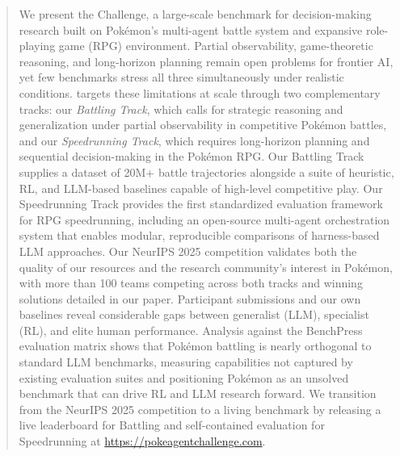 \begin{abstract}
    We present the \pokeagent Challenge, a large-scale benchmark for decision-making research built on Pokémon's multi-agent battle system and expansive role-playing game (RPG) environment. Partial observability, game-theoretic reasoning, and long-horizon planning remain open problems for frontier AI, yet few benchmarks stress all three simultaneously under realistic conditions. \pokeagent targets these limitations at scale through two complementary tracks: our \textit{Battling Track}, which calls for strategic reasoning and generalization under partial observability in competitive Pokémon battles, and our \textit{Speedrunning Track}, which requires long-horizon planning and sequential decision-making in the Pokémon RPG. Our Battling Track supplies a dataset of 20M+ battle trajectories alongside a suite of heuristic, RL, and LLM-based baselines capable of high-level competitive play. Our Speedrunning Track provides the first standardized evaluation framework for RPG speedrunning, including an open-source multi-agent orchestration system that enables modular, reproducible comparisons of harness-based LLM approaches. Our NeurIPS 2025 competition validates both the quality of our resources and the research community's interest in Pokémon, with more than 100 teams competing across both tracks and winning solutions detailed in our paper. Participant submissions and our own baselines reveal considerable gaps between generalist (LLM), specialist (RL), and elite human performance. Analysis against the BenchPress evaluation matrix shows that Pokémon battling is nearly orthogonal to standard LLM benchmarks, measuring capabilities not captured by existing evaluation suites and positioning Pokémon as an unsolved benchmark that can drive RL and LLM research forward. We transition from the NeurIPS 2025 competition to a living benchmark by releasing a live leaderboard for Battling and self-contained evaluation for Speedrunning at \url{https://pokeagentchallenge.com}.
    \end{abstract}
    
    
